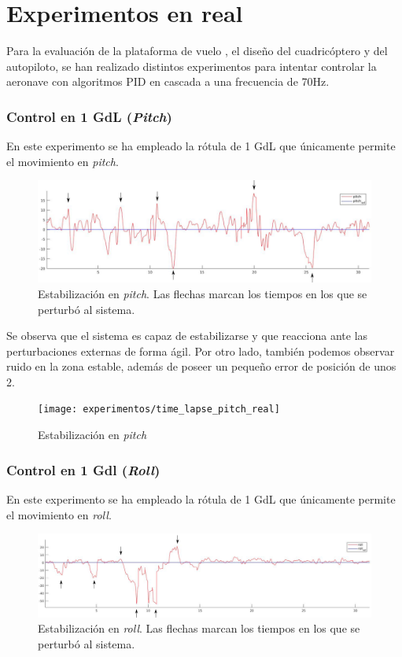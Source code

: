 \section{Experimentos en real}
Para la evaluación de la plataforma de vuelo , el diseño del cuadricóptero y del autopiloto, se han realizado distintos experimentos para intentar controlar la aeronave con algoritmos PID en cascada a una frecuencia de 70Hz.
\subsubsection{Control en 1 GdL (\textit{Pitch})}

En este experimento se ha empleado la rótula de 1 GdL que únicamente permite el movimiento en \textit{pitch}.

\begin{figure}[htb!]
	\centering
	\includegraphics[width=\textwidth]{experimentos/real_only_pitch}
	\caption{Estabilización en \textit{pitch}. Las flechas marcan los tiempos en los que se perturbó al sistema.}
	\label{mat_lab_graph}	
\end{figure}

Se observa que el sistema es capaz de estabilizarse y que reacciona ante las perturbaciones externas de forma ágil. Por otro lado, también podemos observar ruido en la zona estable, además de poseer un pequeño error de posición de unos 2\grad.

\begin{figure}[htb!]
	\centering
	\texttt{[image: experimentos/time\_lapse\_pitch\_real]}
	\caption{Estabilización en \textit{pitch}}
	\label{tl_pr}	
\end{figure}


\subsubsection{Control en 1 Gdl (\textit{Roll})}
En este experimento se ha empleado la rótula de 1 GdL que únicamente permite el movimiento en \textit{roll}.

\begin{figure}[htb!]
	\centering
	\includegraphics[height=0.18\textheight,width=\textwidth]{experimentos/real_only_roll}
	\caption{Estabilización en \textit{roll}. Las flechas marcan los tiempos en los que se perturbó al sistema.}
	\label{mat_lab_graph}	
\end{figure}

